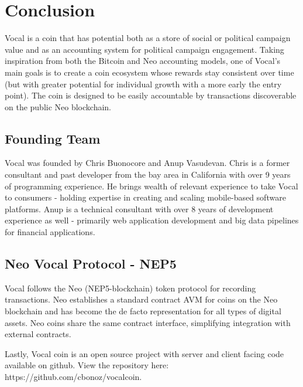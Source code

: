 \documentclass[conference]{IEEEtran}
\begin{document}
    \FloatBarrier
    \section{Conclusion}
   Vocal is a coin that has potential both as a store of social or political campaign value and as an accounting system for political campaign engagement. Taking inspiration from both the Bitcoin and Neo accounting models, one of Vocal's main goals is to create a coin ecosystem whose rewards stay consistent over time (but with greater potential for individual growth with a more early the entry point). The coin is designed to be easily accountable by transactions discoverable on the public Neo blockchain.

    \subsection{Founding Team}
   Vocal was founded by Chris Buonocore and Anup Vasudevan. Chris is a former consultant and past developer from the bay area in California with over 9 years of programming experience.
   He brings wealth of relevant experience to take Vocal to consumers - holding expertise in creating and scaling mobile-based software platforms. Anup is a technical consultant with over 8
   years of development experience as well - primarily web application development and big data pipelines for financial applications.

    \subsection{Neo Vocal Protocol - NEP5}
   Vocal follows the Neo (NEP5-blockchain) token protocol for recording transactions.
    Neo establishes a standard contract AVM for coins on the Neo blockchain and has become the de facto representation for all types of digital assets. Neo coins share the same contract interface, simplifying integration with external contracts.

    Lastly, Vocal coin is an open source project with server and client facing code available on github. View the repository here: https://github.com/cbonoz/vocalcoin.

    \printbibliography
   
    
\end{document}
